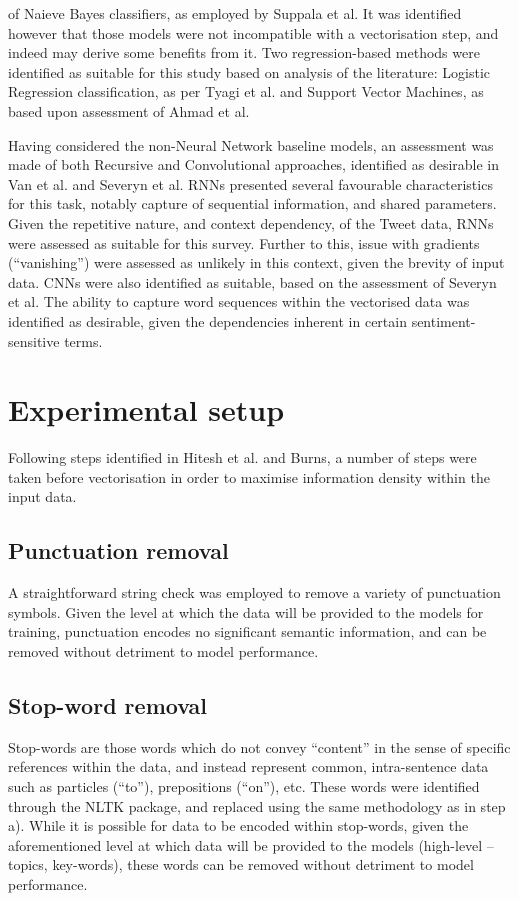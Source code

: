 \documentclass{article}
\begin{document}
of Naieve Bayes classifiers, as employed by Suppala et al. It was identified
however that those models were not incompatible with a vectorisation step, and
indeed may derive some benefits from it. Two regression-based methods were
identified as suitable for this study based on analysis of the literature:
Logistic Regression classification, as per Tyagi et al. and Support Vector
Machines, as based upon assessment of Ahmad et al.
\par
Having considered the non-Neural Network baseline models, an assessment was made
of both Recursive and Convolutional approaches, identified as desirable in Van
et al. and Severyn et al. RNNs presented several favourable characteristics for
this task, notably capture of sequential information, and shared parameters.
Given the repetitive nature, and context dependency, of the Tweet data, RNNs
were assessed as suitable for this survey. Further to this, issue with gradients
(“vanishing”) were assessed as unlikely in this context, given the brevity of
input data. CNNs were also identified as suitable, based on the assessment of
Severyn et al. The ability to capture word sequences within the vectorised data
was identified as desirable, given the dependencies inherent in certain
sentiment-sensitive terms.
\par
\section{Experimental setup}
Following steps identified in Hitesh et al. and Burns, a number of steps were
taken before vectorisation in order to maximise information density within the
input data.
\subsection{Punctuation removal}
A straightforward string check was employed to remove a variety of punctuation
symbols. Given the level at which the data will be provided to the models for
training, punctuation encodes no significant semantic information, and can be
removed without detriment to model performance.
\subsection{Stop-word removal}
Stop-words are those words which do not convey “content” in the sense of
specific references within the data, and instead represent common,
intra-sentence data such as particles (“to”), prepositions (“on”), etc. These
words were identified through the NLTK package, and replaced using the same
methodology as in step a). While it is possible for data to be encoded within
stop-words, given the aforementioned level at which data will be provided to the
models (high-level – topics, key-words), these words can be removed without
detriment to model performance.
\end{document}
